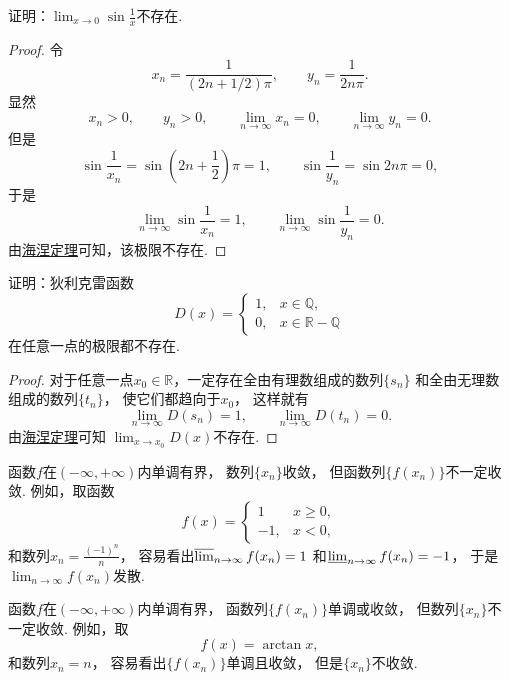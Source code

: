 \begin{example}
证明：\(\lim_{x\to0} \sin\frac1x\)不存在.
\begin{proof}
令\[
	x_n = \frac1{(2n+1/2)\pi},
	\qquad
	y_n = \frac1{2n\pi}.
\]
显然\[
	x_n>0,
	\qquad
	y_n>0,
	\qquad
	\lim_{n\to\infty} x_n = 0,
	\qquad
	\lim_{n\to\infty} y_n = 0.
\]
但是\[
	\sin\frac1{x_n}
	= \sin\left(2n+\frac12\right)\pi
	= 1,
	\qquad
	\sin\frac1{y_n}
	= \sin 2n\pi
	= 0,
\]
于是\[
	\lim_{n\to\infty} \sin\frac1{x_n} = 1,
	\qquad
	\lim_{n\to\infty} \sin\frac1{y_n} = 0.
\]
由\hyperref[theorem:极限.海涅定理]{海涅定理}可知，该极限不存在.
\end{proof}
\end{example}
\begin{example}\label{example:海涅定理.狄利克雷函数在任意一点的极限都不存在}
证明：狄利克雷函数\[
	D(x) = \left\{ \begin{array}{ll}
		1, & x \in \mathbb{Q}, \\
		0, & x \in \mathbb{R}-\mathbb{Q}
	\end{array} \right.
\]在任意一点的极限都不存在.
\begin{proof}
对于任意一点\(x_0\in\mathbb{R}\)，一定存在全由有理数组成的数列\(\{s_n\}\)
和全由无理数组成的数列\(\{t_n\}\)，
使它们都趋向于\(x_0\)，
这样就有\[
	\lim_{n\to\infty} D(s_n) = 1,
	\qquad
	\lim_{n\to\infty} D(t_n) = 0.
\]
由\hyperref[theorem:极限.海涅定理]{海涅定理}可知
\(\lim_{x \to x_0} D(x)\)不存在.
\end{proof}
\end{example}

\begin{example}
函数\(f\)在\((-\infty,+\infty)\)内单调有界，
数列\(\{x_n\}\)收敛，
但函数列\(\{f(x_n)\}\)不一定收敛.
例如，取函数\[
	f(x) = \left\{ \begin{array}{rl}
		1 & x\geq0, \\
		-1, & x<0,
	\end{array} \right.
\]
和数列\(x_n = \frac{(-1)^n}{n}\)，
容易看出\(\varlimsup_{n\to\infty} f(x_n) = 1\)
和\(\varliminf_{n\to\infty} f(x_n) = -1\)，
于是\(\lim_{n\to\infty} f(x_n)\)发散.
\end{example}

\begin{example}
函数\(f\)在\((-\infty,+\infty)\)内单调有界，
函数列\(\{f(x_n)\}\)单调或收敛，
但数列\(\{x_n\}\)不一定收敛.
例如，取\[
	f(x) = \arctan x,
\]
和数列\(x_n = n\)，
容易看出\(\{f(x_n)\}\)单调且收敛，
但是\(\{x_n\}\)不收敛.
\end{example}

